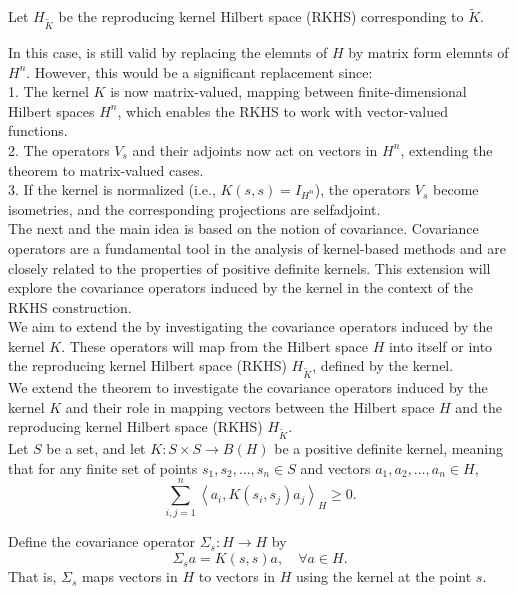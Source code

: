 \documentclass[11pt]{amsart}
\theoremstyle{definition}
\numberwithin{equation}{section}
\begin{document}
Let \( H_{\tilde{K}} \) be the reproducing kernel Hilbert space (RKHS) corresponding to \( \tilde{K} \).

\noindent
In this case, \cite[ Theorem 2.1]{Jorgensen2024} is still valid by replacing the elemnts of $H$ by matrix form elemnts of $H^n$. However, this would be a significant replacement since:\\
1. The kernel $K$ is now matrix-valued, mapping between finite-dimensional Hilbert spaces $H^n$, which enables the RKHS to work with vector-valued functions.\\
2. The operators $V_s$ and their adjoints now act on vectors in $H^n$, extending the theorem to matrix-valued cases.\\
3. If the kernel is normalized (i.e., $K(s,s)=I_{H^n}$), the operators $V_s$ become isometries, and the corresponding projections are selfadjoint.\\

\noindent
The next and the main idea is based on the notion of covariance. Covariance operators are a fundamental tool in the analysis of kernel-based methods and are closely related to the properties of positive definite kernels. This extension will explore the covariance operators induced by the kernel in the context of the RKHS construction.\\

\noindent
We aim to extend the \cite[theorem 2.1]{Jorgensen2024} by investigating the covariance operators induced by the kernel $K$. These operators will map from the Hilbert space $H$ into itself or into the reproducing kernel Hilbert space (RKHS) $H_{\tilde{K}}$, defined by the kernel.\\

\noindent
We extend the theorem to investigate the covariance operators induced by the kernel \( K \) and their role in mapping vectors between the Hilbert space \( H \) and the reproducing kernel Hilbert space (RKHS) \( H_{\tilde{K}} \).\\

\noindent
Let \( S \) be a set, and let \( K: S \times S \to B(H) \) be a positive definite kernel, meaning that for any finite set of points \( s_1, s_2, \dots, s_n \in S \) and vectors \( a_1, a_2, \dots, a_n \in H \),
\[
\sum_{i,j=1}^{n} \left\langle a_i, K(s_i, s_j) a_j \right\rangle_H \geq 0.
\]

Define the covariance operator \( \Sigma_s: H \to H \) by
\[
\Sigma_s a = K(s,s)a, \quad \forall a \in H.
\]
That is, \( \Sigma_s \) maps vectors in \( H \) to vectors in \( H \) using the kernel at the point \( s \).
\end{document}
